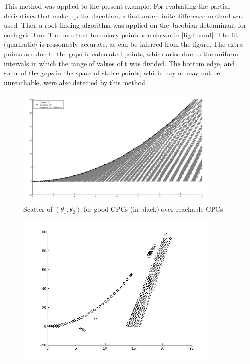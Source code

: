 \begin{multicols}{2}
This method was applied to the present example. For evaluating the partial 
derivatives that make up the Jacobian, a first-order finite difference 
method was used. Then a root-finding algorithm was applied on the Jacobian 
determinant for each grid line. The resultant boundary points are shown in 
\autoref{fig:bound}. The fit (quadratic) is reasonably accurate, as can be 
inferred from the figure. The extra points are due to the gaps in 
calculated points, which arise due to the uniform intervals in which 
the range of values of \gls{t} was divided. The bottom edge, and some 
of the gaps in the space of stable points, which may or may not be 
unreachable, were also detected by this method.
%
\begin{figure}
\centering
\includegraphics[width=0.9\textwidth]{Sources/Images/bound.jpg}
\caption{Scatter of $(\theta_1, \theta_2)$ for good CPCs (in black) over reachable CPCs}
\label{fig:theta}
\end{figure}
%
\reversemarginpar
\begin{figure}
\centering
\includegraphics[width=0.9\textwidth]{Sources/Images/allbound.jpg}

\end{figure}
\end{multicols}

